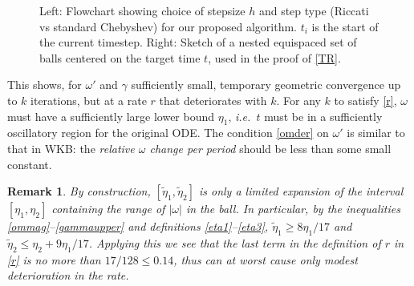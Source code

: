 \documentclass[10pt]{article}
\newcommand{\ie}{{\it i.e.\ }}
\newtheorem{rmk}[thm]{Remark}
\newcommand{\om}{\omega}
\newcommand{\g}{\gamma}
\newcommand{\te}{\tilde\eta}
\begin{document}
\begin{figure}[tb]
    \centering
    \hfill
    \caption{\label{balls-flowchart} Left: Flowchart showing choice of stepsize $h$ and step type (Riccati vs standard Chebyshev) for our proposed algorithm.
      $t_i$ is the start of the current timestep.
    Right: Sketch of a nested equispaced set of
      balls centered on the target time $t$, used in the proof of \cref{TR}.}
\end{figure}

This shows, for $\om'$ and $\g$ sufficiently small,
temporary geometric convergence up to $k$ iterations,
but at a rate $r$ that deteriorates with $k$.
For any $k$ to satisfy \cref{r}, $\om$ must have
a sufficiently large lower bound $\eta_1$, \ie $t$
must be in a sufficiently oscillatory region for the original ODE.
The condition \cref{omder} on $\om'$ is similar to
that in WKB: the \emph{relative $\om$ change per period} should be less than some small constant.

\begin{rmk}\label{slight}
  By construction, $[\te_1,\te_2]$ is only a limited
  expansion of the interval $[\eta_1,\eta_2]$ containing the range of $|\om|$ in the ball.
  In particular, by the inequalities \cref{ommag}--\cref{gammaupper} and
  definitions \cref{eta1}--\cref{eta3},
  $\te_1 \ge 8\eta_1/17$ and $\te_2 \le \eta_2 + 9\eta_1/17$.
  Applying this we see that the last term in the definition of $r$ in \cref{r}
  is no more than $17/128 \leq 0.14$, thus can at worst cause only modest
  deterioration in the rate.
\end{rmk}
\end{document}
